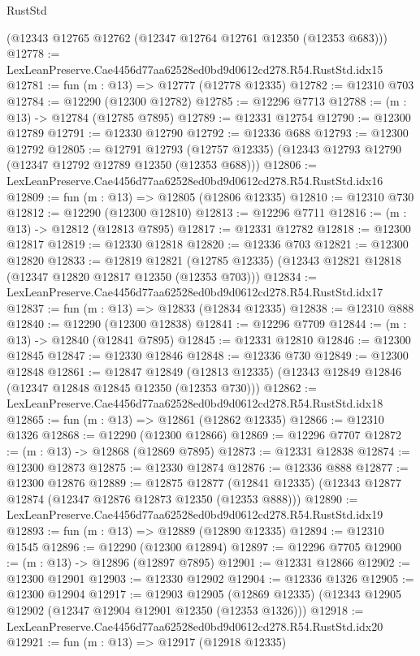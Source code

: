 \begin{lexlean}{RustStd}
\begin{coremodule}
    (@12343 @12765 @12762 (@12347 @12764 @12761 @12350 (@12353 @683)))
@12778 := LexLeanPreserve.Cae4456d77aa62528ed0bd9d0612cd278.R54.RustStd.idx15
@12781 := fun (m : @13) => @12777 (@12778 @12335)
@12782 := @12310 @703
@12784 := @12290 (@12300 @12782)
@12785 := @12296 @7713
@12788 := (m : @13) -> @12784 (@12785 @7895)
@12789 := @12331 @12754
@12790 := @12300 @12789
@12791 := @12330 @12790
@12792 := @12336 @688
@12793 := @12300 @12792
@12805 := @12791
    @12793
    (@12757 @12335)
    (@12343 @12793 @12790 (@12347 @12792 @12789 @12350 (@12353 @688)))
@12806 := LexLeanPreserve.Cae4456d77aa62528ed0bd9d0612cd278.R54.RustStd.idx16
@12809 := fun (m : @13) => @12805 (@12806 @12335)
@12810 := @12310 @730
@12812 := @12290 (@12300 @12810)
@12813 := @12296 @7711
@12816 := (m : @13) -> @12812 (@12813 @7895)
@12817 := @12331 @12782
@12818 := @12300 @12817
@12819 := @12330 @12818
@12820 := @12336 @703
@12821 := @12300 @12820
@12833 := @12819
    @12821
    (@12785 @12335)
    (@12343 @12821 @12818 (@12347 @12820 @12817 @12350 (@12353 @703)))
@12834 := LexLeanPreserve.Cae4456d77aa62528ed0bd9d0612cd278.R54.RustStd.idx17
@12837 := fun (m : @13) => @12833 (@12834 @12335)
@12838 := @12310 @888
@12840 := @12290 (@12300 @12838)
@12841 := @12296 @7709
@12844 := (m : @13) -> @12840 (@12841 @7895)
@12845 := @12331 @12810
@12846 := @12300 @12845
@12847 := @12330 @12846
@12848 := @12336 @730
@12849 := @12300 @12848
@12861 := @12847
    @12849
    (@12813 @12335)
    (@12343 @12849 @12846 (@12347 @12848 @12845 @12350 (@12353 @730)))
@12862 := LexLeanPreserve.Cae4456d77aa62528ed0bd9d0612cd278.R54.RustStd.idx18
@12865 := fun (m : @13) => @12861 (@12862 @12335)
@12866 := @12310 @1326
@12868 := @12290 (@12300 @12866)
@12869 := @12296 @7707
@12872 := (m : @13) -> @12868 (@12869 @7895)
@12873 := @12331 @12838
@12874 := @12300 @12873
@12875 := @12330 @12874
@12876 := @12336 @888
@12877 := @12300 @12876
@12889 := @12875
    @12877
    (@12841 @12335)
    (@12343 @12877 @12874 (@12347 @12876 @12873 @12350 (@12353 @888)))
@12890 := LexLeanPreserve.Cae4456d77aa62528ed0bd9d0612cd278.R54.RustStd.idx19
@12893 := fun (m : @13) => @12889 (@12890 @12335)
@12894 := @12310 @1545
@12896 := @12290 (@12300 @12894)
@12897 := @12296 @7705
@12900 := (m : @13) -> @12896 (@12897 @7895)
@12901 := @12331 @12866
@12902 := @12300 @12901
@12903 := @12330 @12902
@12904 := @12336 @1326
@12905 := @12300 @12904
@12917 := @12903
    @12905
    (@12869 @12335)
    (@12343 @12905 @12902 (@12347 @12904 @12901 @12350 (@12353 @1326)))
@12918 := LexLeanPreserve.Cae4456d77aa62528ed0bd9d0612cd278.R54.RustStd.idx20
@12921 := fun (m : @13) => @12917 (@12918 @12335)

\end{coremodule}
\end{lexlean}
